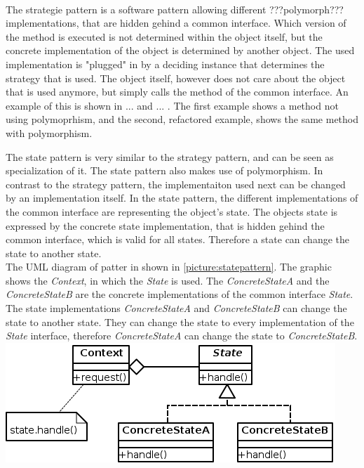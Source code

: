\\
The strategie pattern is a software pattern allowing different ???polymorph??? implementations, that are hidden gehind a common interface. Which version of the method is executed is not determined within the object itself, but the concrete implementation of the object is determined by another object. The used implementation is "plugged" in by a deciding instance that determines the strategy that is used. The object itself, however does not care about the object that is used anymore, but simply calls the method of the common interface. An example of this is shown in ... and ... . The first example shows a method not using polymoprhism, and the second, refactored example, shows the same method with polymorphism.


The state pattern is very similar to the strategy pattern, and can be seen as specialization of it. The state pattern also makes use of polymorphism. In contrast to the strategy pattern, the implementaiton used next can be changed by an implementation itself. In the state pattern, the different implementations of the common interface are representing the object's state. The objects state is expressed by the concrete state implementation, that is hidden gehind the common interface, which is valid for all states. Therefore a state can change the state to another state.\\

The \acf{UML} diagram of patter in shown in \ref{picture:statepattern}. The graphic shows the \textit{Context}, in which the \textit{State} is used. The \textit{ConcreteStateA} and the \textit{ConcreteStateB} are the concrete implementations of the common interface \textit{State}. The state implementations  \textit{ConcreteStateA} and \textit{ConcreteStateB} can change the state to another state. They can change the state to every implementation of the \textit{State} interface, therefore \textit{ConcreteStateA} can change the state to \textit{ConcreteStateB}. 
\includegraphics{Bilder/StatePattern.PNG}
\label{picture:statepattern}

